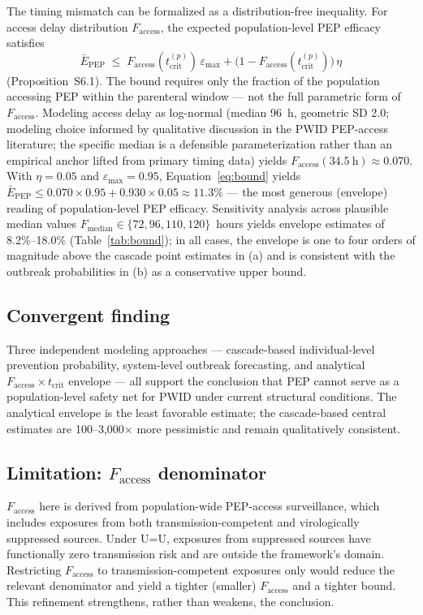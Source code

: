 \documentclass[10pt,letterpaper]{article}
\theoremstyle{definition}
\theoremstyle{remark}
\newcommand{\Ebarpep}{\bar{E}_{\text{PEP}}}
\newcommand{\Faccess}{F_{\text{access}}}
\newcommand{\tcrit}{t_{\text{crit}}}
\newcommand{\emax}{\varepsilon_{\max}}
\begin{document}
The timing mismatch can be formalized as a distribution-free inequality. For access delay distribution $\Faccess$, the expected population-level PEP efficacy satisfies
\begin{equation}
\Ebarpep \;\leq\; \Faccess(\tcrit^{(p)})\,\emax + \big(1 - \Faccess(\tcrit^{(p)})\big)\,\eta
\label{eq:bound}
\end{equation}
(Proposition~S6.1). The bound requires only the fraction of the population accessing PEP within the parenteral window --- not the full parametric form of $\Faccess$. Modeling access delay as log-normal (median 96~h, geometric SD 2.0; modeling choice informed by qualitative discussion in the PWID PEP-access literature\cite{taylor2019,baugher2025}; the specific median is a defensible parameterization rather than an empirical anchor lifted from primary timing data) yields $\Faccess(34.5~\text{h}) \approx 0.070$. With $\eta = 0.05$ and $\emax = 0.95$, Equation~\ref{eq:bound} yields $\Ebarpep \leq 0.070 \times 0.95 + 0.930 \times 0.05 \approx 11.3\%$ --- the most generous (envelope) reading of population-level PEP efficacy. Sensitivity analysis across plausible median values $F_{\text{median}} \in \{72, 96, 110, 120\}$~hours yields envelope estimates of 8.2\%--18.0\% (Table~\ref{tab:bound}); in all cases, the envelope is one to four orders of magnitude above the cascade point estimates in (a) and is consistent with the outbreak probabilities in (b) as a conservative upper bound.

\subsection*{Convergent finding}

Three independent modeling approaches --- cascade-based individual-level prevention probability, system-level outbreak forecasting, and analytical $\Faccess \times \tcrit$ envelope --- all support the conclusion that PEP cannot serve as a population-level safety net for PWID under current structural conditions. The analytical envelope is the least favorable estimate; the cascade-based central estimates are 100--3{,}000$\times$ more pessimistic and remain qualitatively consistent.

\subsection*{Limitation: $\Faccess$ denominator}

$\Faccess$ here is derived from population-wide PEP-access surveillance, which includes exposures from both transmission-competent and virologically suppressed sources. Under U=U\cite{rodger2019,bavinton2018}, exposures from suppressed sources have functionally zero transmission risk and are outside the framework's domain. Restricting $\Faccess$ to transmission-competent exposures only would reduce the relevant denominator and yield a tighter (smaller) $\Faccess$ and a tighter bound. This refinement strengthens, rather than weakens, the conclusion.
\end{document}
